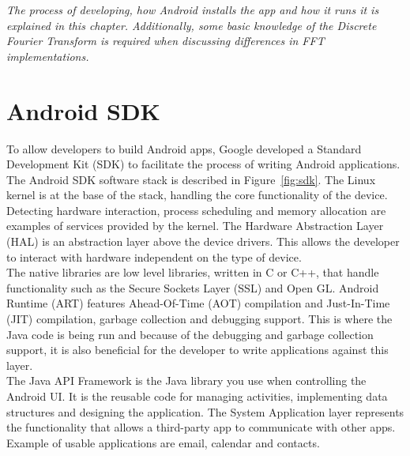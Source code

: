 \textit{The process of developing, how Android installs the app and how it runs it is explained in this chapter. Additionally, some basic knowledge of the Discrete Fourier Transform is required when discussing differences in FFT implementations.}

\section{Android SDK}
To allow developers to build Android apps, Google developed a Standard Development Kit (SDK) to facilitate the process of writing Android applications. The Android SDK software stack is described in Figure~\ref{fig:sdk}. The Linux kernel is at the base of the stack, handling the core functionality of the device. Detecting hardware interaction, process scheduling and memory allocation are examples of services provided by the kernel. The Hardware Abstraction Layer (HAL) is an abstraction layer above the device drivers. This allows the developer to interact with hardware independent on the type of device\cite{android:hal}.\\

The native libraries are low level libraries, written in C or C++, that handle functionality such as the Secure Sockets Layer (SSL) and Open GL\cite{komatineni2012pro}. Android Runtime (ART) features Ahead-Of-Time (AOT) compilation and Just-In-Time (JIT) compilation, garbage collection and debugging support\cite{android:sdk:stack}. This is where the Java code is being run and because of the debugging and garbage collection support, it is also beneficial for the developer to write applications against this layer.\\

The Java API Framework is the Java library you use when controlling the Android UI. It is the reusable code for managing activities, implementing data structures and designing the application. The System Application layer represents the functionality that allows a third-party app to communicate with other apps. Example of usable applications are email, calendar and contacts\cite{android:sdk:stack}.

